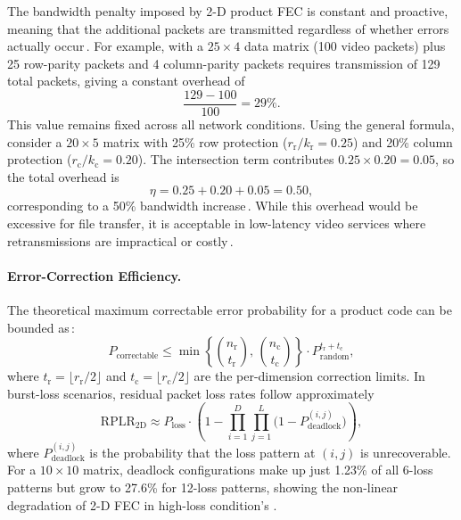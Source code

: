 The bandwidth penalty imposed by 2-D product FEC is constant and proactive, meaning that the additional packets are transmitted regardless of whether errors actually occur\,\cite{fec_overhead_study}.  
For example, with a \(25 \times 4\) data matrix (100 video packets) plus 25 row-parity packets and 4 column-parity packets requires transmission of 129 total packets, giving a constant overhead of  
\begin{equation}
	\frac{129 - 100}{100} = 29\%.
\end{equation}
This value remains fixed across all network conditions. Using the general formula, consider a \(20 \times 5\) matrix with 25\% row protection (\(r_{\mathrm r}/k_{\mathrm r} = 0.25\)) and 20\% column protection (\(r_{\mathrm c}/k_{\mathrm c} = 0.20\)).  
The intersection term contributes \(0.25 \times 0.20 = 0.05\), so the total overhead is  
\begin{equation}
	\eta = 0.25 + 0.20 + 0.05 = 0.50,
\end{equation}
corresponding to a 50\% bandwidth increase\,\cite{2d_fec_bounds}. While this overhead would be excessive for file transfer, it is acceptable in low-latency video services where retransmissions are impractical or costly\,\cite{limit_fec,huawei_afec}.

\paragraph{Error-Correction Efficiency.}
\label{sec:error correction efficiency}

The theoretical maximum correctable error probability for a product code can be bounded as\,\cite{rs_error_bounds}:
\begin{equation}
	P_{\mathrm{correctable}} \leq \min \left\{ \binom{n_{\mathrm r}}{t_{\mathrm r}}, \, \binom{n_{\mathrm c}}{t_{\mathrm c}} \right\} \cdot P_{\mathrm{random}}^{t_{\mathrm r} + t_{\mathrm c}},
\end{equation}
where \(t_{\mathrm r} = \lfloor r_{\mathrm r} / 2 \rfloor\) and \(t_{\mathrm c} = \lfloor r_{\mathrm c} / 2 \rfloor\) are the per-dimension correction limits.  
In burst-loss scenarios, residual packet loss rates follow approximately
\begin{equation}
	\mathrm{RPLR}_{2\mathrm{D}} \approx P_{\mathrm{loss}} \cdot \left( 1 - \prod_{i=1}^D \prod_{j=1}^L \big(1 - P_{\mathrm{deadlock}}^{(i,j)}\big) \right),
\end{equation}
where \(P_{\mathrm{deadlock}}^{(i,j)}\) is the probability that the loss pattern at \((i,j)\) is unrecoverable.  
For a \(10 \times 10\) matrix, deadlock configurations make up just 1.23\% of all 6-loss patterns but grow to 27.6\% for 12-loss patterns, showing the non-linear degradation of 2-D FEC in high-loss condition's \cite{2d_fec_bounds}.

